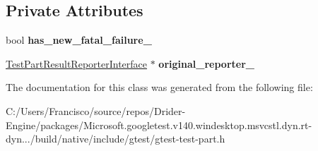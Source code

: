 \subsection*{Private Attributes}
\begin{DoxyCompactItemize}
\item 
\mbox{\label{classtesting_1_1internal_1_1_has_new_fatal_failure_helper_a172103f6aefee8c387a44679888fee30}} 
bool {\bfseries has\+\_\+new\+\_\+fatal\+\_\+failure\+\_\+}
\item 
\mbox{\label{classtesting_1_1internal_1_1_has_new_fatal_failure_helper_a9f8be46b6aa39666e4a8557f240629e5}} 
\hyperlink{classtesting_1_1_test_part_result_reporter_interface}{Test\+Part\+Result\+Reporter\+Interface} $\ast$ {\bfseries original\+\_\+reporter\+\_\+}
\end{DoxyCompactItemize}


The documentation for this class was generated from the following file\+:\begin{DoxyCompactItemize}
\item 
C\+:/\+Users/\+Francisco/source/repos/\+Drider-\/\+Engine/packages/\+Microsoft.\+googletest.\+v140.\+windesktop.\+msvcstl.\+dyn.\+rt-\/dyn.../build/native/include/gtest/gtest-\/test-\/part.\+h\end{DoxyCompactItemize}

